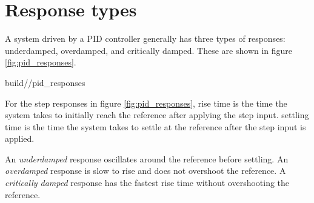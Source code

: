 \section{Response types}

A \gls{system} driven by a PID controller generally has three types of
responses: underdamped, overdamped, and critically damped. These are shown in
figure \ref{fig:pid_responses}.

\begin{svg}{build/\chapterpath/pid_responses}
  \caption{PID controller response types}
  \label{fig:pid_responses}
\end{svg}

For the \glspl{step response} in figure \ref{fig:pid_responses}, \gls{rise time}
is the time the \gls{system} takes to initially reach the \gls{reference} after
applying the \gls{step input}. \Gls{settling time} is the time the \gls{system}
takes to settle at the \gls{reference} after the \gls{step input} is applied.

An \textit{underdamped} response oscillates around the \gls{reference} before
settling. An \textit{overdamped} response is slow to rise and does not overshoot
the \gls{reference}. A \textit{critically damped} response has the fastest
\gls{rise time} without overshooting the \gls{reference}.
